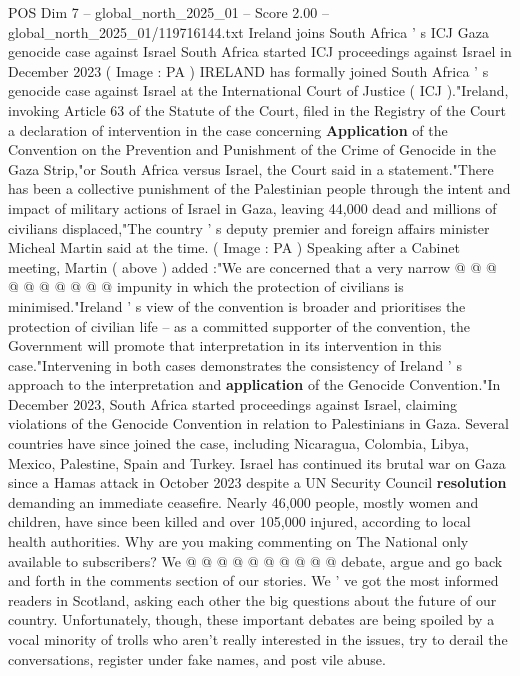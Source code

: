 \begin{textsample}{POS Dim 7 – global\_north\_2025\_01 – Score 2.00 – global\_north\_2025\_01/119716144.txt}  \label{ex:f7_pos_396}
Ireland joins South Africa ' s ICJ Gaza genocide case against Israel South Africa started ICJ proceedings against Israel in December 2023 ( Image : PA ) IRELAND has formally joined South Africa ' s genocide case against Israel at the International Court of Justice ( ICJ )."Ireland, invoking Article 63 of the Statute of the Court, filed in the Registry of the Court a declaration of intervention in the case concerning \textbf{Application} of the Convention on the Prevention and Punishment of the Crime of Genocide in the Gaza Strip,"or South Africa versus Israel, the Court said in a statement."There has been a collective punishment of the Palestinian people through the intent and impact of military actions of Israel in Gaza, leaving 44,000 dead and millions of civilians displaced,"The country ' s deputy premier and foreign affairs minister Micheal Martin said at the time. ( Image : PA ) Speaking after a Cabinet meeting, Martin ( above ) added :"We are concerned that a very narrow @ @ @ @ @ @ @ @ @ @ impunity in which the protection of civilians is minimised."Ireland ' s view of the convention is broader and prioritises the protection of civilian life -- as a committed supporter of the convention, the Government will promote that interpretation in its intervention in this case."Intervening in both cases demonstrates the consistency of Ireland ' s approach to the interpretation and \textbf{application} of the Genocide Convention."In December 2023, South Africa started proceedings against Israel, claiming violations of the Genocide Convention in relation to Palestinians in Gaza.
Several countries have since joined the case, including Nicaragua, Colombia, Libya, Mexico, Palestine, Spain and Turkey.
Israel has continued its brutal war on Gaza since a Hamas attack in October 2023 despite a UN Security Council \textbf{resolution} demanding an immediate ceasefire.
Nearly 46,000 people, mostly women and children, have since been killed and over 105,000 injured, according to local health authorities.
Why are you making commenting on The National only available to subscribers?
We @ @ @ @ @ @ @ @ @ @ debate, argue and go back and forth in the comments section of our stories.
We ' ve got the most informed readers in Scotland, asking each other the big questions about the future of our country.
Unfortunately, though, these important debates are being spoiled by a vocal minority of trolls who aren't really interested in the issues, try to derail the conversations, register under fake names, and post vile abuse.

\end{textsample}
